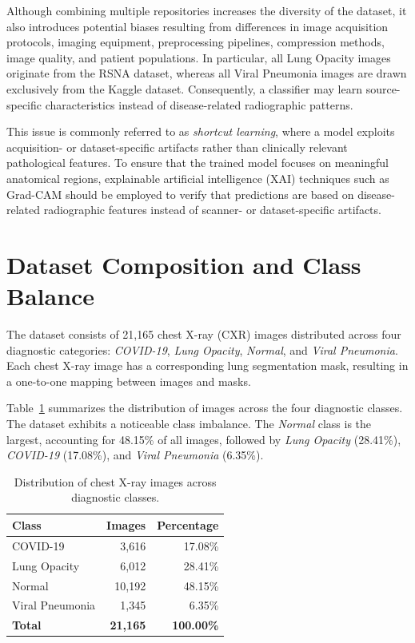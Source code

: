 Although combining multiple repositories increases the diversity of the
dataset, it also introduces potential biases resulting from differences in
image acquisition protocols, imaging equipment, preprocessing pipelines,
compression methods, image quality, and patient populations. In particular,
all Lung Opacity images originate from the RSNA dataset, whereas all Viral
Pneumonia images are drawn exclusively from the Kaggle dataset. Consequently,
a classifier may learn source-specific characteristics instead of
disease-related radiographic patterns.

This issue is commonly referred to as \textit{shortcut learning}, where a
model exploits acquisition- or dataset-specific artifacts rather than
clinically relevant pathological features. To ensure that the trained model
focuses on meaningful anatomical regions, explainable artificial intelligence
(XAI) techniques such as Grad-CAM should be employed to verify that predictions
are based on disease-related radiographic features instead of scanner- or
dataset-specific artifacts.

\section{Dataset Composition and Class Balance}

The dataset consists of 21,165 chest X-ray (CXR) images distributed across four
diagnostic categories: \textit{COVID-19}, \textit{Lung Opacity},
\textit{Normal}, and \textit{Viral Pneumonia}. Each chest X-ray image has a
corresponding lung segmentation mask, resulting in a one-to-one mapping between
images and masks.

Table~\ref{tab:class_distribution} summarizes the distribution of images across
the four diagnostic classes. The dataset exhibits a noticeable class imbalance.
The \textit{Normal} class is the largest, accounting for 48.15\% of all images,
followed by \textit{Lung Opacity} (28.41\%), \textit{COVID-19} (17.08\%), and
\textit{Viral Pneumonia} (6.35\%).

\begin{table}[H]
\centering
\caption{Distribution of chest X-ray images across diagnostic classes.}
\label{tab:class_distribution}
\begin{tabular}{lrr}
\toprule
\textbf{Class} & \textbf{Images} & \textbf{Percentage} \\
\midrule
COVID-19 & 3,616 & 17.08\% \\
Lung Opacity & 6,012 & 28.41\% \\
Normal & 10,192 & 48.15\% \\
Viral Pneumonia & 1,345 & 6.35\% \\
\midrule
\textbf{Total} & \textbf{21,165} & \textbf{100.00\%} \\
\bottomrule
\end{tabular}
\end{table}

